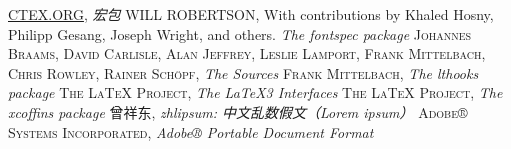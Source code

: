 \documentclass{ctxdoc}
\begin{document}
\begin{thebibliography}{9}
\href{http://www.ctex.org}{CTEX.ORG},
\newblock \textit{ 宏包}
\textsc{WILL ROBERTSON},
\newblock With contributions by Khaled Hosny, Philipp Gesang, Joseph Wright, and others.
\newblock \textit{The fontspec package}
\textsc{Johannes Braams,
David Carlisle,
Alan Jeffrey,
Leslie Lamport,
Frank Mittelbach,
Chris Rowley,
Rainer Schöpf},
\newblock \textit{The {\LaTeXe} Sources}
\textsc{Frank Mittelbach},
\newblock \textit{The lthooks package}
\textsc{The {\LaTeX} Project},
\newblock \textit{The {\LaTeX3} Interfaces}
\textsc{The \LaTeX{} Project},
\newblock \textit{The xcoffins package}
{\kaishu 曾祥东},
\newblock \textit{zhlipsum: 中文乱数假文（Lorem ipsum）}
\textsc{Adobe® Systems Incorporated},
\newblock \textit{Adobe® Portable Document Format}
\end{thebibliography}

\IndexLayout
\zitiebackground[off]
\PrintChanges
\PrintIndex
\end{document}
